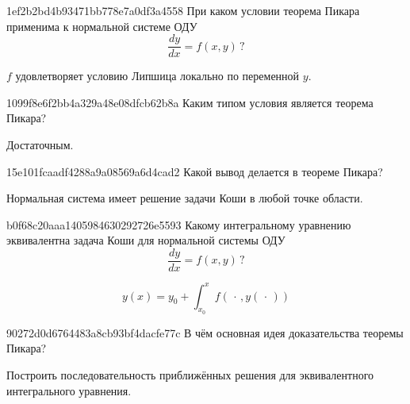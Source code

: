 \begin{note}{1ef2b2bd4b93471bb778e7a0df3a4558}
    При каком условии теорема Пикара применима к нормальной системе ОДУ
    \[
        \frac{dy}{dx} = f(x, y)\,?
    \]

    \begin{cloze}{1}
        \({ f }\) удовлетворяет условию Липшица локально по переменной \({ y }\).
    \end{cloze}
\end{note}

\begin{note}{1099f8e6f2bb4a329a48e08dfcb62b8a}
    Каким типом условия является теорема Пикара?

    \begin{cloze}{1}
        Достаточным.
    \end{cloze}
\end{note}

\begin{note}{15e101fcaadf4288a9a08569a6d4cad2}
    Какой вывод делается в теореме Пикара?

    \begin{cloze}{1}
        Нормальная система имеет решение задачи Коши в любой точке области.
    \end{cloze}
\end{note}

\begin{note}{b0f68c20aaa1405984630292726e5593}
    Какому интегральному уравнению эквивалентна задача Коши для нормальной системы ОДУ
    \[
        \frac{dy}{dx} = f(x, y)\,?
    \]

    \begin{cloze}{1}
        \[
            y(x) = y_0 + \int_{x_0}^{x} f(\,\cdot\,, y( \,\cdot\, ))
        \]
    \end{cloze}
\end{note}

\begin{note}{90272d0d6764483a8cb93bf4dacfe77c}
    В чём основная идея доказательства теоремы Пикара?

    \begin{cloze}{1}
        Построить последовательность приближённых решения для эквивалентного интегрального уравнения.
    \end{cloze}
\end{note}


